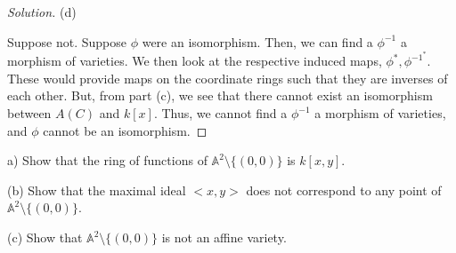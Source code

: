 \documentclass[10pt]{article}
\newenvironment{problem}[2][Problem]{\begin{trivlist}
\item[\hskip \labelsep {\bfseries #1}\hskip \labelsep {\bfseries #2.}]}{\end{trivlist}}
\begin{document}
\begin{proof}[Solution]
(d)

Suppose not. Suppose $\phi$ were an isomorphism. Then, we can find a $\phi^{-1}$ a morphism of varieties. We then look at the respective induced maps, $\phi^*, \phi^{-1^*}$. These would provide maps on the coordinate rings such that they are inverses of each other. But, from part (c), we see that there cannot exist an isomorphism between $A(C)$ and $k[x]$. Thus, we cannot find a $\phi^{-1}$ a morphism of varieties, and $\phi$ cannot be an isomorphism.


\end{proof}

\begin{problem}{4.3}

(a) Show that the ring of functions of $\mathbb{A}^2 \setminus \{ (0,0) \}$ is $k[x,y]$.

(b) Show that the maximal ideal $<x,y>$ does not correspond to any point of $\mathbb{A}^2 \setminus \{ (0,0) \}$.

(c) Show that $\mathbb{A}^2 \setminus \{ (0,0) \}$ is not an affine variety.

\end{problem}
\end{document}
